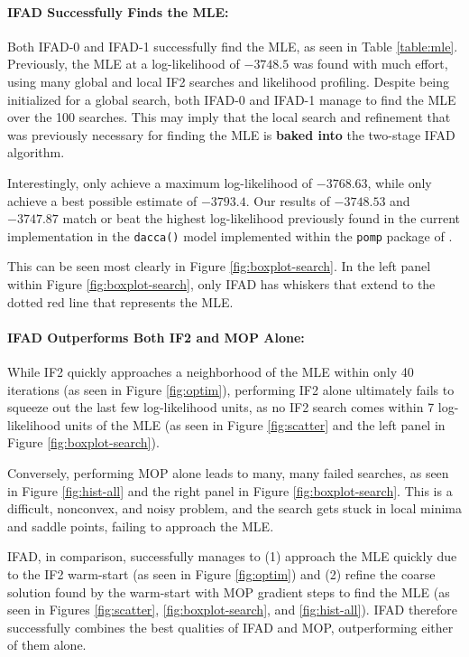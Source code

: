 \documentclass{article}
\begin{document}
\paragraph{IFAD Successfully Finds the MLE:} Both IFAD-0 and IFAD-1 successfully find the MLE, as seen in Table \ref{table:mle}. Previously, the MLE at a log-likelihood of $-3748.5$ was found with much effort, using many global and local IF2 searches and likelihood profiling. Despite being initialized for a global search, both IFAD-0 and IFAD-1 manage to find the MLE over the 100 searches. This may imply that the local search and refinement that was previously necessary for finding the MLE is \textbf{baked into} the two-stage IFAD algorithm. 

Interestingly, \cite{ionides15} only achieve a maximum log-likelihood of $-3768.63$, while \cite{king08} only achieve a best possible estimate of $-3793.4$. Our results of $-3748.53$ and $-3747.87$ match or beat the highest log-likelihood previously found in the current implementation in the \texttt{dacca()} model implemented within the \texttt{pomp} package of \cite{king16}.

This can be seen most clearly in Figure \ref{fig:boxplot-search}. In the left panel within Figure \ref{fig:boxplot-search}, only IFAD has whiskers that extend to the dotted red line that represents the MLE. 

\paragraph{IFAD Outperforms Both IF2 and MOP Alone:} While IF2 quickly approaches a neighborhood of the MLE within only 40 iterations (as seen in Figure \ref{fig:optim}), performing IF2 alone ultimately fails to squeeze out the last few log-likelihood units, as no IF2 search comes within 7 log-likelihood units of the MLE (as seen in Figure \ref{fig:scatter} and the left panel in Figure \ref{fig:boxplot-search}).

Conversely, performing MOP alone leads to many, many failed searches, as seen in Figure \ref{fig:hist-all} and the right panel in Figure \ref{fig:boxplot-search}. This is a difficult, nonconvex, and noisy problem, and the search gets stuck in local minima and saddle points, failing to approach the MLE. 

IFAD, in comparison, successfully manages to (1) approach the MLE quickly due to the IF2 warm-start (as seen in Figure \ref{fig:optim}) and (2) refine the coarse solution found by the warm-start with MOP gradient steps to find the MLE (as seen in Figures \ref{fig:scatter}, \ref{fig:boxplot-search}, and \ref{fig:hist-all}). IFAD therefore successfully combines the best qualities of IFAD and MOP, outperforming either of them alone. 
\end{document}
